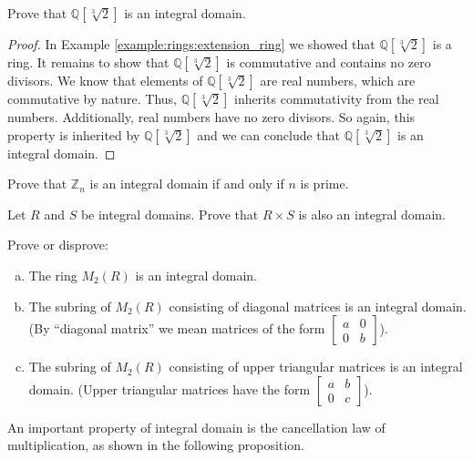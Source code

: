 \begin{example}{}
Prove that ${\mathbb Q}[\sqrt[3]{2}]$ is an integral domain.

\begin{proof}
In Example \ref{example:rings:extension_ring} we showed that ${\mathbb Q}[\sqrt[3]{2}]$ is a ring.  It remains to show that ${\mathbb Q}[\sqrt[3]{2}]$ is commutative and contains no zero divisors.  We know that elements of ${\mathbb Q}[\sqrt[3]{2}]$ are real numbers, which are commutative by nature.  Thus, ${\mathbb Q}[\sqrt[3]{2}]$ inherits commutativity from the real numbers.  Additionally, real numbers have no zero divisors.  So again, this property is inherited by ${\mathbb Q}[\sqrt[3]{2}]$ and we can conclude that ${\mathbb Q}[\sqrt[3]{2}]$ is an integral domain.
\end{proof}
\end{example}

\begin{exercise}{}
Prove that  ${\mathbb Z}_n$ is an integral domain if and only if $n$ is prime.
\end{exercise}

\begin{exercise}{}
Let $R$ and $S$ be integral domains. Prove that $R\times S$ is also an integral domain.
\end{exercise}

\begin{exercise}{}
Prove or disprove:
\begin{enumerate}[(a)]
\item
The ring $M_2(R)$ is an integral domain.
\item
The subring of $M_2(R)$ consisting of diagonal matrices is an integral domain. (By ``diagonal matrix'' we mean matrices of the form 
$ \begin{bmatrix}
a & 0 \\ 0 & b
\end{bmatrix}$).
\item
The subring of $M_2(R)$ consisting of upper triangular matrices is an integral domain. (Upper triangular matrices have the form 
$ \begin{bmatrix}
a & b \\ 0 & c
\end{bmatrix}$).
\end{enumerate}
\end{exercise}

An important property of integral domain is the cancellation law of multiplication, as shown in the following proposition.

